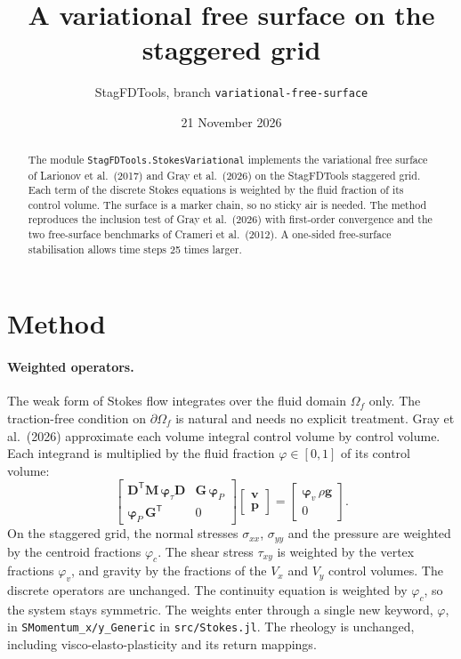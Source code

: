 \documentclass[11pt,a4paper]{article}
\title{A variational free surface on the staggered grid}
\author{StagFDTools, branch \texttt{variational-free-surface}}
\date{21 November 2026}
\begin{document}
\maketitle

\begin{abstract}
The module \texttt{StagFDTools.StokesVariational} implements the variational free surface of Larionov et al.\ (2017) and Gray et al.\ (2026) on the StagFDTools staggered grid. Each term of the discrete Stokes equations is weighted by the fluid fraction of its control volume. The surface is a marker chain, so no sticky air is needed. The method reproduces the inclusion test of Gray et al.\ (2026) with first-order convergence and the two free-surface benchmarks of Crameri et al.\ (2012). A one-sided free-surface stabilisation allows time steps 25 times larger.
\end{abstract}

\section{Method}

\paragraph{Weighted operators.} The weak form of Stokes flow integrates over the fluid domain $\Omega_f$ only. The traction-free condition on $\partial\Omega_f$ is natural and needs no explicit treatment. Gray et al.\ (2026) approximate each volume integral control volume by control volume. Each integrand is multiplied by the fluid fraction $\varphi\in[0,1]$ of its control volume:
\begin{equation}
\begin{bmatrix} \mathbf D^\mathsf T \mathbf M\, \bm\varphi_\tau \mathbf D & \mathbf G\,\bm\varphi_P \\ \bm\varphi_P\, \mathbf G^\mathsf T & 0 \end{bmatrix}
\begin{bmatrix} \mathbf v \\ \mathbf p \end{bmatrix} =
\begin{bmatrix} \bm\varphi_v\, \rho\mathbf g \\ 0 \end{bmatrix}.
\end{equation}
On the staggered grid, the normal stresses $\sigma_{xx}$, $\sigma_{yy}$ and the pressure are weighted by the centroid fractions $\varphi_c$. The shear stress $\tau_{xy}$ is weighted by the vertex fractions $\varphi_v$, and gravity by the fractions of the $V_x$ and $V_y$ control volumes. The discrete operators are unchanged. The continuity equation is weighted by $\varphi_c$, so the system stays symmetric. The weights enter through a single new keyword, \texttt{\ensuremath{\varphi}}, in \texttt{SMomentum\_x/y\_Generic} in \texttt{src/Stokes.jl}. The rheology is unchanged, including visco-elasto-plasticity and its return mappings.
\end{document}
